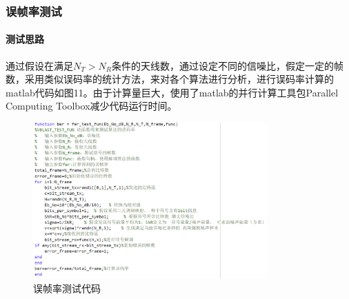 \documentclass[a4paper,12pt]{article}
\begin{document}
	\subsubsection{误帧率测试}
	\paragraph{测试思路}
	通过假设在满足$N_T>N_R$条件的天线数，通过设定不同的信噪比，假定一定的帧数，采用类似误码率的统计方法，来对各个算法进行分析，进行误码率计算的matlab代码如图11。由于计算量巨大，使用了matlab的并行计算工具包Parallel Computing Toolbox减少代码运行时间。\par
	\begin{figure}[h]
		\centering
		\includegraphics[width=0.8\textwidth]{11.png}
		\caption{误帧率测试代码}
	\end{figure}
\end{document}
